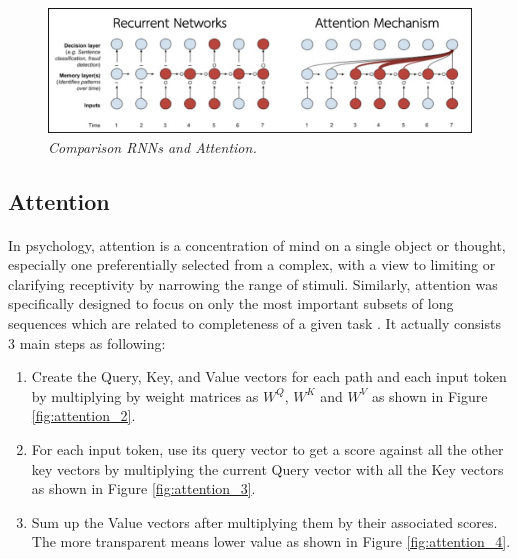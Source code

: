 \begin{figure}[H]
  \centering
  \caption[Comparison RNNs and Attention.]{\emph{Comparison RNNs and Attention.}}\label{fig:rnnvsattention}
  \includegraphics[scale = 0.4
  ]{figures/rnnvsattention.jpg}  
\end{figure}
\subsection{Attention}
\paragraph{}
In psychology, attention is  a concentration of mind on a single object or thought, especially one preferentially selected from a complex, with a view to limiting or clarifying receptivity by narrowing the range of stimuli. Similarly, attention was specifically designed to focus on only the most important subsets of long sequences which are related to completeness of a given task \cite{alammar_2018,alammar_2019,klingenbrunn_2021}. It actually consists 3 main steps as following:
\begin{enumerate}
\item Create the Query, Key, and Value vectors for each path and each input token by multiplying by weight matrices as $W^Q$, $W^K$ and $W^V$ as shown in Figure \ref{fig:attention_2}.
\item For each input token, use its query vector to get a score against all the other key vectors by multiplying the current Query vector with all the Key vectors as shown in Figure \ref{fig:attention_3}.
\item Sum up the Value vectors after multiplying them by their associated scores. The more transparent means lower value as shown in Figure \ref{fig:attention_4}.
\end{enumerate}

